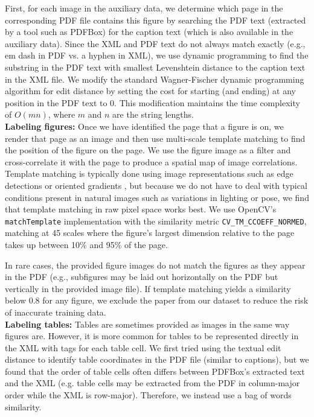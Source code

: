 \documentclass[sigconf]{acmart}
\begin{document}
First, for each image in the auxiliary data, we determine which page in the corresponding PDF file contains this figure by searching the PDF text (extracted by a tool such as PDFBox) for the caption text (which is also available in the auxiliary data).
Since the XML and PDF text do not always match exactly (e.g., em dash in PDF vs. a hyphen in XML), we use dynamic programming to find the substring in the PDF text with smallest Levenshtein distance to the caption text in the XML file.
We modify the standard Wagner-Fischer dynamic programming algorithm for edit distance \cite{wagner1974string} by setting the cost for starting (and ending) at any position in the PDF text to 0.
This modification maintains the time complexity of $O(mn)$, where $m$ and $n$ are the string lengths. 
\\[15pt]\textbf{Labeling figures:}%
Once we have identified the page that a figure is on, we render that page as an image and then use multi-scale template matching \cite{brunelli2009template} to find the position of the figure on the page.
We use the figure image as a filter and cross-correlate it with the page to produce a spatial map of image correlations. 
Template matching is typically done using image representations such as edge detections or oriented gradients \cite{brunelli2009template}, but because we do not have to deal with typical conditions present in natural images such as variations in lighting or pose, we find that template matching in raw pixel space works best. 
We use OpenCV's \texttt{matchTemplate} implementation with the similarity metric \texttt{CV\_TM\_CCOEFF\_NORMED}, matching at 45 scales where the figure's largest dimension relative to the page takes up between 10\% and 95\% of the page. 

In rare cases, the provided figure images do not match the figures as they appear in the PDF (e.g., subfigures may be laid out horizontally on the PDF but vertically in the provided image file). 
If template matching yields a similarity below 0.8 for any figure, we exclude the paper from our dataset to reduce the risk of inaccurate training data.
\\[15pt]\textbf{Labeling tables:}%
Tables are sometimes provided as images in the same way figures are.
However, it is more common for tables to be represented directly in the XML with tags for each table cell. 
We first tried using the textual edit distance to identify table coordinates in the PDF file (similar to captions), but we found that the order of table cells often differs between PDFBox's extracted text and the XML (e.g. table cells may be extracted from the PDF in column-major order while the XML is row-major). 
Therefore, we instead use a bag of words similarity. 
\end{document}
